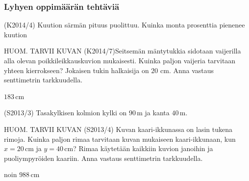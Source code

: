 



\subsubsection*{Lyhyen oppimäärän tehtäviä}


\begin{tehtava}
	(K2014/4)  Kuution särmän pituus puolittuu. Kuinka monta prosenttia pienenee kuution
	\begin{alakohdat}
	\end{alakohdat}
						
						\begin{vastaus}
						\begin{alakohdat}
						 \alakohta{$87,5\%$}
						 \alakohta{$75\%$}
						\end{alakohdat}					  
	\end{vastaus}
	\end{tehtava}

\begin{tehtava}
HUOM. TARVII KUVAN 
(K2014/7)Seitsemän mäntytukkia sidotaan vaijerilla alla olevan poikkileikkauskuvion mukaisesti. Kuinka paljon vaijeria tarvitaan yhteen kierrokseen? Jokaisen tukin halkaisija on $20$ cm.
Anna vastaus senttimetrin tarkkuudella. 
  \begin{vastaus}
  $183$\,cm
  \end{vastaus}
\end{tehtava}

\begin{tehtava}(S2013/3) Tasakylkisen kolmion kylki on $90$\,m ja kanta $40$\,m.
\begin{alakohdat}
\end{alakohdat}
    \begin{vastaus}
    \begin{alakohdat}
	\alakohta{$26^\circ$}
	\alakohta{$1755$\,$\text{m}^2$}
   \end{alakohdat}
 \end{vastaus}
\end{tehtava}

\begin{tehtava}
HUOM. TARVII KUVAN 
(S2013/4) Kuvan kaari-ikkunassa on lasin tukena rimoja. Kuinka paljon rimaa tarvitaan kuvan mukaiseen kaari-ikkunaan, kun $x=20$\,cm ja $y=40$\,cm? Rimaa käytetään kaikkiin kuvion janoihin ja puoliympyröiden kaariin. Anna vastaus senttimetrin tarkkuudella.
  \begin{vastaus}
  noin $988$\,cm
  \end{vastaus}
\end{tehtava}


